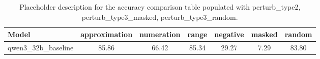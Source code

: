 \begin{table}[ht]
\centering
{}
\small
\begin{tabular}{lcccccc}
\hline
Model & approximation & numeration & range & negative & masked & random \\
\hline
qwen3\_32b\_baseline & 85.86 & 66.42 & 85.34 & 29.27 & 7.29 & 83.80 \\
\hline
\end{tabular}
\caption{Placeholder description for the accuracy comparison table populated with perturb\_type2, perturb\_type3\_masked, perturb\_type3\_random.}
\end{table}
